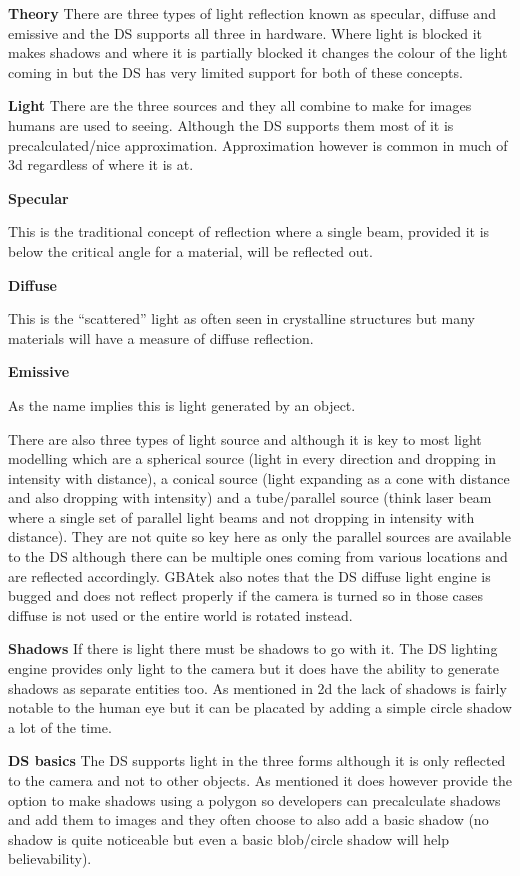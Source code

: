 \documentclass[
]{book}
\begin{document}
\textbf{Theory} There are three types of light reflection known as specular, diffuse and emissive and the DS supports all three in hardware. Where light is blocked it makes shadows and where it is partially blocked it changes the colour of the light coming in but the DS has very limited support for both of these concepts.

\textbf{Light} There are the three sources and they all combine to make for images humans are used to seeing. Although the DS supports them most of it is precalculated/nice approximation. Approximation however is common in much of 3d regardless of where it is at.

\textbf{Specular}

This is the traditional concept of reflection where a single beam, provided it is below the critical angle for a material, will be reflected out.

\textbf{Diffuse}

This is the ``scattered'' light as often seen in crystalline structures but many materials will have a measure of diffuse reflection.

\textbf{Emissive}

As the name implies this is light generated by an object.

There are also three types of light source and although it is key to most light modelling which are a spherical source (light in every direction and dropping in intensity with distance), a conical source (light expanding as a cone with distance and also dropping with intensity) and a tube/parallel source (think laser beam where a single set of parallel light beams and not dropping in intensity with distance). They are not quite so key here as only the parallel sources are available to the DS although there can be multiple ones coming from various locations and are reflected accordingly. GBAtek also notes that the DS diffuse light engine is bugged and does not reflect properly if the camera is turned so in those cases diffuse is not used or the entire world is rotated instead.

\textbf{Shadows} If there is light there must be shadows to go with it. The DS lighting engine provides only light to the camera but it does have the ability to generate shadows as separate entities too. As mentioned in 2d the lack of shadows is fairly notable to the human eye but it can be placated by adding a simple circle shadow a lot of the time.

\textbf{DS basics} The DS supports light in the three forms although it is only reflected to the camera and not to other objects. As mentioned it does however provide the option to make shadows using a polygon so developers can precalculate shadows and add them to images and they often choose to also add a basic shadow (no shadow is quite noticeable but even a basic blob/circle shadow will help believability).
\end{document}

